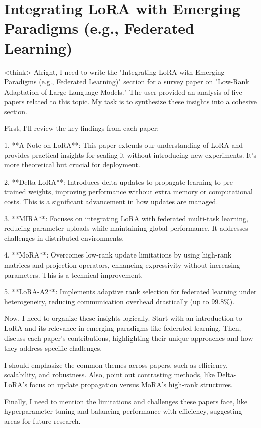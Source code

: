 \documentclass[conference]{IEEEtran}
\begin{document}
\section{Integrating LoRA with Emerging Paradigms (e.g., Federated Learning)}
<think>
Alright, I need to write the "Integrating LoRA with Emerging Paradigms (e.g., Federated Learning)" section for a survey paper on "Low-Rank Adaptation of Large Language Models." The user provided an analysis of five papers related to this topic. My task is to synthesize these insights into a cohesive section.

First, I'll review the key findings from each paper:

1. **A Note on LoRA**: This paper extends our understanding of LoRA and provides practical insights for scaling it without introducing new experiments. It's more theoretical but crucial for deployment.

2. **Delta-LoRA**: Introduces delta updates to propagate learning to pre-trained weights, improving performance without extra memory or computational costs. This is a significant advancement in how updates are managed.

3. **MIRA**: Focuses on integrating LoRA with federated multi-task learning, reducing parameter uploads while maintaining global performance. It addresses challenges in distributed environments.

4. **MoRA**: Overcomes low-rank update limitations by using high-rank matrices and projection operators, enhancing expressivity without increasing parameters. This is a technical improvement.

5. **LoRA-A2**: Implements adaptive rank selection for federated learning under heterogeneity, reducing communication overhead drastically (up to 99.8\%).

Now, I need to organize these insights logically. Start with an introduction to LoRA and its relevance in emerging paradigms like federated learning. Then, discuss each paper's contributions, highlighting their unique approaches and how they address specific challenges.

I should emphasize the common themes across papers, such as efficiency, scalability, and robustness. Also, point out contrasting methods, like Delta-LoRA's focus on update propagation versus MoRA's high-rank structures.

Finally, I need to mention the limitations and challenges these papers face, like hyperparameter tuning and balancing performance with efficiency, suggesting areas for future research.
\end{document}
